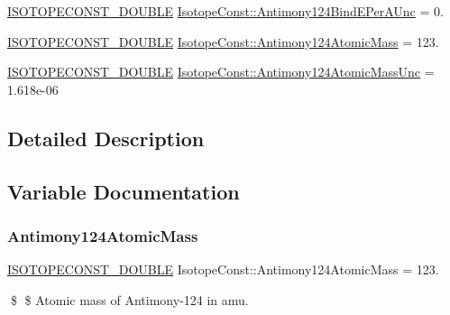 \begin{DoxyCompactItemize}
\mbox{\hyperlink{group___isotope_const-_macros_ga8f45a7272ce02c0b4c65c44636ed719a}{I\+S\+O\+T\+O\+P\+E\+C\+O\+N\+S\+T\+\_\+\+D\+O\+U\+B\+LE}} \mbox{\hyperlink{group___isotope_const-_antimony-_sb124_ga4f395ebc1429a9f680ac182ec2fbd9fc}{Isotope\+Const\+::\+Antimony124\+Bind\+E\+Per\+A\+Unc}} = 0.
\item 
\mbox{\hyperlink{group___isotope_const-_macros_ga8f45a7272ce02c0b4c65c44636ed719a}{I\+S\+O\+T\+O\+P\+E\+C\+O\+N\+S\+T\+\_\+\+D\+O\+U\+B\+LE}} \mbox{\hyperlink{group___isotope_const-_antimony-_sb124_ga9b00d7e82e752e01148b134b07552b34}{Isotope\+Const\+::\+Antimony124\+Atomic\+Mass}} = 123.
\item 
\mbox{\hyperlink{group___isotope_const-_macros_ga8f45a7272ce02c0b4c65c44636ed719a}{I\+S\+O\+T\+O\+P\+E\+C\+O\+N\+S\+T\+\_\+\+D\+O\+U\+B\+LE}} \mbox{\hyperlink{group___isotope_const-_antimony-_sb124_ga5d213fd856ae632b2ac0bd6725f5d0c7}{Isotope\+Const\+::\+Antimony124\+Atomic\+Mass\+Unc}} = 1.\+618e-\/06
\end{DoxyCompactItemize}


\subsection{Detailed Description}


\subsection{Variable Documentation}
\mbox{\label{group___isotope_const-_antimony-_sb124_ga9b00d7e82e752e01148b134b07552b34}} 
\subsubsection{\texorpdfstring{Antimony124\+Atomic\+Mass}{Antimony124AtomicMass}}
{\footnotesize\ttfamily \mbox{\hyperlink{group___isotope_const-_macros_ga8f45a7272ce02c0b4c65c44636ed719a}{I\+S\+O\+T\+O\+P\+E\+C\+O\+N\+S\+T\+\_\+\+D\+O\+U\+B\+LE}} Isotope\+Const\+::\+Antimony124\+Atomic\+Mass = 123.}

\$ \$ Atomic mass of Antimony-\/124 in amu. \mbox{\label{group___isotope_const-_antimony-_sb124_ga5d213fd856ae632b2ac0bd6725f5d0c7}} 
